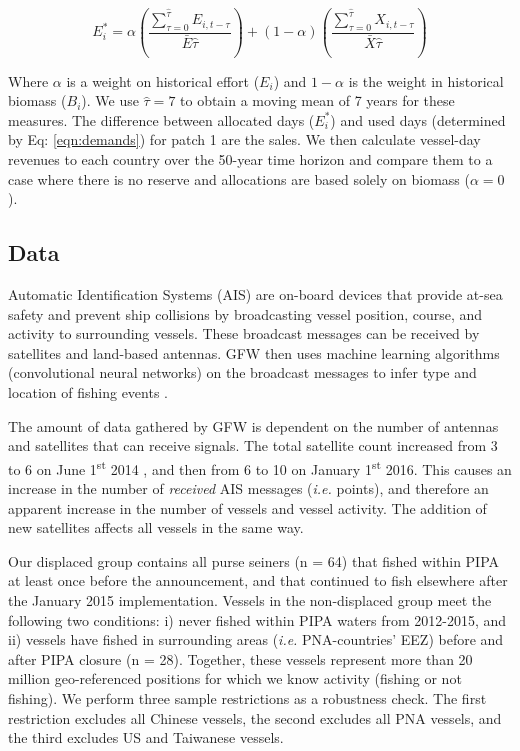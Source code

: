\documentclass[12pt]{article}
\begin{document}
$$
E_i^* = \alpha \left(\frac{\sum_{\tau = 0}^{\hat{\tau}}E_{i,t-\tau}}{\bar{E}\hat{\tau}} \right) +
(1 - \alpha) \left(\frac{\sum_{\tau = 0}^{\hat{\tau}}X_{i,t-\tau}}{\bar{X}\hat{\tau}} \right)
$$

Where  $\alpha$ is a weight on historical effort ($E_i$) and $1-\alpha$ is the weight in historical biomass ($B_i$). We use $\hat{\tau}= 7$ to obtain a moving mean of 7 years for these measures. The difference between allocated days ($E_i^*$) and used days (determined by Eq: \ref{eqn:demands}) for patch 1 are the sales. We then calculate vessel-day revenues to each country over the 50-year time horizon and compare them to a case where there is no reserve and allocations are based solely on biomass ($\alpha = 0$).

\subsection{Data}

Automatic Identification Systems (AIS) are on-board devices that provide at-sea safety and prevent ship collisions by broadcasting vessel position, course, and activity to surrounding vessels. These broadcast messages can be received by satellites and land-based antennas. GFW then uses machine learning algorithms (convolutional neural networks) on the broadcast messages to infer type and location of fishing events \cite{kroodsma_2018}.

The amount of data gathered by GFW is dependent on the number of antennas and satellites that can receive signals. The total satellite count increased from 3 to 6 on June 1\textsuperscript{st} 2014 , and then from 6 to 10 on January 1\textsuperscript{st} 2016. This causes an increase in the number of \emph{received} AIS messages (\emph{i.e.} points), and therefore an apparent increase in the number of vessels and vessel activity. The addition of new satellites affects all vessels in the same way.

Our displaced group contains all purse seiners (n = 64) that fished within PIPA at least once before the announcement, and that continued to fish elsewhere after the January 2015 implementation. Vessels in the non-displaced group meet the following two conditions: i) never fished within PIPA waters from 2012-2015, and ii) vessels have fished in surrounding areas (\emph{i.e.} PNA-countries' EEZ) before and after PIPA closure (n = 28). Together, these vessels represent more than 20 million geo-referenced positions for which we know activity (fishing or not fishing). We perform three sample restrictions as a robustness check. The first restriction excludes all Chinese vessels, the second excludes all PNA vessels, and the third excludes US and Taiwanese vessels.
\end{document}
